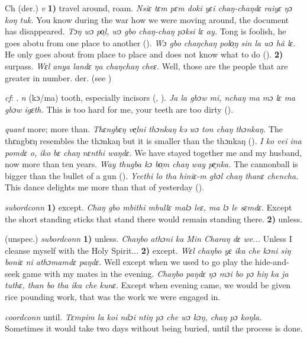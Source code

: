 \begin{letter}{Ch}
 (der.) \textit{v} \textbf{1)} travel around, roam. \textit{Nsiɛ tɛm pɛm doki yɛi chaŋ-chaŋdɛ raiyɛ ŋɔ koŋ tuk.} You know during the war how we were moving around, the document has disappeared. \textit{Tɔŋ wɔ po̹l, wɔ gbo chaŋ-chaŋ pɔksi lɛ ay.} Tong is foolish, he goes abotu from one place to another (\citealt{Pichl1967}). \textit{Wɔ gbo chaŋchaŋ polo̹ŋ sin la wɔ hã lɛ.} He only goes about from place to place and does not know what to do (\citealt{Pichl1967}). \textbf{2)} surpass. \textit{Wɛl anya landɛ ŋa chaŋchaŋ cheɛ.} Well, those are the people that are greater in number. der.  (see )

 \textit{cf}: . \textit{n} (kɔ/ma) tooth, especially incisors (\citealt{Pichl1967}, \citealt{Sumner1921}). \textit{Ja la gbɔw mi, nchaŋ ma mɔ lɛ ma gbɔw igɛth.} This is too hard for me, your teeth are too dirty (\citealt{Pichl1967}). 

 \textit{quant} more; more than. \textit{Thɛngbɛŋ ve̹lni thɔnkaŋ kə wɔ ton chaŋ thɔnkaŋ.} The thɛngbɛŋ resembles the thɔnkaŋ but it is smaller than the thɔnkaŋ (\citealt{Pichl1967}). \textit{I ko vei ina pomdɛ o, iko bɛ chaŋ nɛnthi waŋdɛ.} We have stayed together me and my husband, now more than ten years. \textit{Way thugba kɔ bo̹m chaŋ way pe̹nka.} The cannonball is bigger than the bullet of a gun (\citealt{Pichl1967}). \textit{Yeethi lo tha hiniɛ-m gbɔl chaŋ thanɛ chencha.} This dance delights me more than that of yesterday (\citealt{Pichl1967}). 

 \textit{subordconn} \textbf{1)} except. \textit{Chaŋ gbo mbithi mbullɛ malɔ leɛ, ma lɔ le sɛmdɛ.} Except the short standing sticks that stand there would remain standing there. \textbf{2)} unless.

 (unspec.) \textit{subordconn} \textbf{1)} unless. \textit{Chaŋbo athɔni ka Min Charaŋ dɛ we...} Unless I cleanse myself with the Holy Spirit... \textbf{2)} except. \textit{Wɛl chaŋbo yɛ ika che kɔni siŋ boniɛ ni athɔmamdɛ paŋdɛ.} Well except when we used to go play the hide-and-seek game with my mates in the evening. \textit{Chaŋbo paŋdɛ ŋɔ mɔi bo pɔ hiŋ ka ja tuthɛ, than bo tha ika che kunɛ.} Except when evening came, we would be given rice pounding work, that was the work we were engaged in.

 \textit{coordconn} until. \textit{Tɛmpim la koi ndɔi ntiŋ pɔ che wɔ kɔŋ, chaŋ pɔ koŋla.} Sometimes it would take two days without being buried, until the process is done.


\end{letter}
